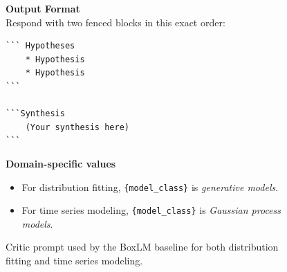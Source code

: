 \documentclass{article}
\begin{document}
\begin{figure}[h]
\begin{mdframed}[linecolor=gray!50, backgroundcolor=gray!5, linewidth=0.8pt]
\medskip
\textbf{Output Format}\\
Respond with two fenced blocks in this exact order:

\begin{verbatim}
``` Hypotheses
    * Hypothesis
    * Hypothesis
```

```Synthesis
    (Your synthesis here)
```
\end{verbatim}

\medskip
\textbf{Domain-specific values}
\begin{itemize}[leftmargin=*, nosep]
    \item For distribution fitting, \texttt{\{model\_class\}} is
          \emph{generative models}.
    \item For time series modeling, \texttt{\{model\_class\}} is
          \emph{Gaussian process models}.
\end{itemize}

\end{mdframed}
\caption{Critic prompt used by the BoxLM baseline for both distribution fitting and time series modeling.}
\label{fig:boxlm-critic-prompt}
\end{figure}


\end{document}
